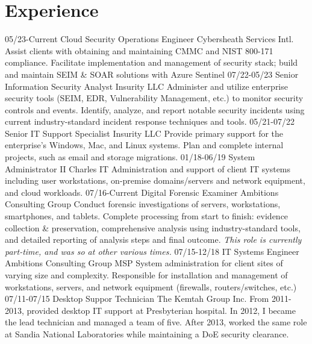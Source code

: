 \documentclass[]{twentysecondcv}
\begin{document}
\section{Experience}
\begin{twenty}
  \twentyitem
    {05/23-Current}
    {Cloud Security Operations Engineer}
    {Cybersheath Services Intl.}
    {Assist clients with obtaining and maintaining CMMC and NIST 800-171 compliance. Facilitate implementation and management of security stack; build and maintain SEIM \& SOAR solutions with Azure Sentinel}
  \twentyitem
    {07/22-05/23}
    {Senior Information Security Analyst}
    {Insurity LLC}
    {Administer and utilize enterprise security tools (SEIM, EDR, Vulnerability Management, etc.) to monitor security controls and events. Identify, analyze, and report notable security incidents using current industry-standard incident response techniques and tools.}
    \twentyitem
    {05/21-07/22}
    {Senior IT Support Specialist}
    {Insurity LLC}
    {Provide primary support for the enterprise's Windows, Mac, and Linux systems. Plan and complete internal projects, such as email and storage migrations.}
    \twentyitem
    {01/18-06/19}
    {System Administrator II}
    {Charles IT}
    {Administration and support of client IT systems including  user workstations, on-premise domains\slash servers and network equipment, and cloud workloads.}
    \twentyitem
    {07/16-Current}
    {Digital Forensic Examiner}
    {Ambitions Consulting Group}
    {Conduct forensic investigations of servers, workstations, smartphones, and tablets. Complete processing from start to finish: evidence collection \& preservation, comprehensive analysis using industry-standard tools, and detailed reporting of analysis steps and final outcome. \emph{This role is currently part-time, and was so at other various times.}}
    \twentyitem
    {07/15-12/18}
    {IT Systems Engineer}
    {Ambitions Consulting Group}
    {MSP System administration for client sites of varying size and complexity. Responsible for installation and management of workstations, servers, and network equipment (firewalls, routers/switches, etc.)}
    \twentyitem
    {07/11-07/15}
    {Desktop Suppor Technician}
    {The Kemtah Group Inc.}
    {From 2011-2013, provided desktop IT support at Presbyterian hospital. In 2012, I became the lead technician and managed a team of five. After 2013, worked the same role at Sandia National Laboratories while maintaining a DoE security clearance.}

\end{twenty}
\end{document}
